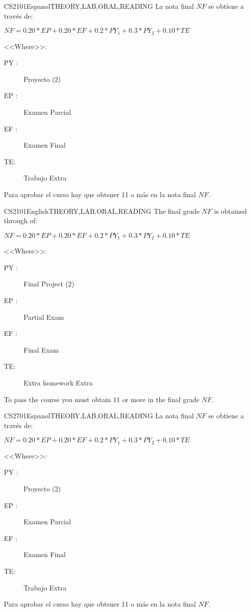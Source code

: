 \begin{evaluation}{CS2101}{Espanol}{THEORY,LAB,ORAL,READING}
La nota final $NF$ se obtiene a través de:

$ NF = 0.20*EP + 0.20*EF + 0.2*PY_{1} + 0.3*PY_{2} + 0.10*TE $

\noindent <<Where>>:
\begin{description}
	\item[PY :] Proyecto (2)
	\item[EP :] Examen Parcial
	\item[EF :] Examen Final
	\item[TE:] Trabajo Extra
\end{description}
\noindent Para aprobar el curso hay que obtener 11 o más en la nota final $NF$.
\end{evaluation}

\begin{evaluation}{CS2101}{English}{THEORY,LAB,ORAL,READING}
The final grade $NF$ is obtained through of:

$ NF = 0.20*EP + 0.20*EF + 0.2*PY_{1} + 0.3*PY_{2} + 0.10*TE $

\noindent <<Where>>:
\begin{description}
	\item[PY :] Final Project (2)
	\item[EP :] Partial Exam
	\item[EF :] Final Exam
	\item[TE:] Extra homework Extra
\end{description}
\noindent To pass the course you must obtain 11 or more in the final grade $NF$.
\end{evaluation}

\begin{evaluation}{CS2701}{Espanol}{THEORY,LAB,ORAL,READING}
La nota final $NF$ se obtiene a través de:

$ NF = 0.20*EP + 0.20*EF + 0.2*PY_{1} + 0.3*PY_{2} + 0.10*TE $

\noindent <<Where>>:
\begin{description}
	\item[PY :] Proyecto (2)
	\item[EP :] Examen Parcial
	\item[EF :] Examen Final
	\item[TE:] Trabajo Extra
\end{description}
\noindent Para aprobar el curso hay que obtener 11 o más en la nota final $NF$.
\end{evaluation}


